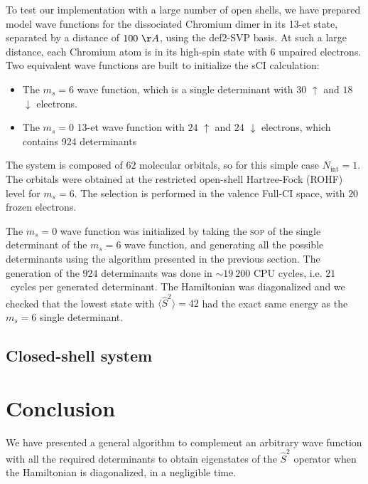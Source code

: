 \documentclass[aip,jcp,reprint,showkeys]{revtex4-1}
\newcommand{\stwo}{\hat{S}^2}
\newcommand{\up}{\uparrow}
\newcommand{\dn}{\downarrow}
\newcommand{\Nint}{{N_\text{int}}}
\newcommand{\sop}{\textsc{sop}}
\begin{document}
To test our implementation with a large number of open shells, we have prepared
model wave functions for the dissociated Chromium dimer in its 13-et state, separated by a
distance of $100~\AA$, using the def2-SVP basis.\cite{Weigend_2005}
At such a large distance, each Chromium atom is in its high-spin state with $6$
unpaired electrons. Two equivalent wave functions are built to initialize the sCI
calculation:
\begin{itemize}
\item The $m_s=6$ wave function, which is a single determinant with $30$ $\up$
      and $18$ $\dn$ electrons.
\item The $m_s=0$ 13-et wave function with $24$ $\up$ and $24$ $\dn$ electrons, which
      contains 924 determinants
\end{itemize}
The system is composed of $62$ molecular orbitals, so for this simple case $\Nint=1$.
The orbitals were obtained at the restricted open-shell Hartree-Fock (ROHF) level
for $m_s=6$.
The selection is performed in the valence Full-CI space, with $20$ frozen electrons.



The $m_s=0$ wave function was initialized by taking the {\sop} of the single determinant
of the $m_s=6$ wave function, and generating all the possible determinants using 
the algorithm presented in the previous section.
The generation of the $924$ determinants was done in $\sim 19~200$ CPU cycles,
i.e. $21$~cycles per generated determinant. The Hamiltonian was diagonalized and
we checked that the lowest state with $\langle \stwo \rangle = 42$ had the exact
same energy as the $m_s=6$ single determinant.


\subsection{Closed-shell system}


\section{Conclusion}

We have presented a general algorithm to complement an arbitrary wave function
with all the required determinants to obtain eigenstates of the $\stwo$
operator when the Hamiltonian is diagonalized, in a negligible time.
\end{document}
